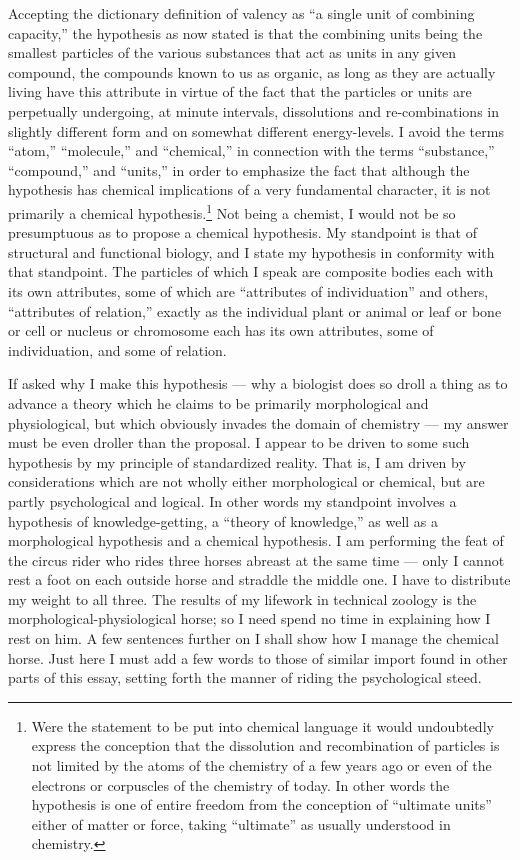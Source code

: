 \documentclass[a4paper, 11pt, oneside, polutonikogreek, english]{article}
\begin{document}
Accepting the dictionary definition of valency as ``a single unit of combining capacity,'' the hypothesis as now stated is that the combining units being the smallest particles of the various substances that act as units in any given compound, the compounds known to us as organic, as long as they are actually living have this attribute in virtue of the fact that the particles or units are perpetually undergoing, at minute intervals, dissolutions and re-combinations in slightly different form and on somewhat different energy-levels. I avoid the terms ``atom,'' ``molecule,'' and ``chemical,'' in connection with the terms ``substance,'' ``compound,'' and ``units,'' in order to emphasize the fact that although the hypothesis has chemical implications of a very fundamental character, it is not primarily a chemical hypothesis.\footnote{Were the statement to be put into chemical language it would undoubtedly express the conception that the dissolution and recombination of particles is not limited by the atoms of the chemistry of a few years ago or even of the electrons or corpuscles of the chemistry of today. In other words the hypothesis is one of entire freedom from the conception of ``ultimate units'' either of matter or force, taking ``ultimate'' as usually understood in chemistry.} Not being a chemist, I would not be so presumptuous as to propose a chemical hypothesis. My standpoint is that of structural and functional biology, and I state my hypothesis in conformity with that standpoint. The particles of which I speak are composite bodies each with its own attributes, some of which are ``attributes of individuation'' and others, ``attributes of relation,'' exactly as the individual plant or animal or leaf or bone or cell or nucleus or chromosome each has its own attributes, some of individuation, and some of relation.

If asked why I make this hypothesis --- why a biologist does so droll a thing as to advance a theory which he claims to be primarily morphological and physiological, but which obviously invades the domain of chemistry --- my answer must be even droller than the proposal. I appear to be driven to some such hypothesis by my principle of standardized reality. That is, I am driven by considerations which are not wholly either morphological or chemical, but are partly psychological and logical. In other words my standpoint involves a hypothesis of knowledge-getting, a ``theory of knowledge,'' as well as a morphological hypothesis and a chemical hypothesis. I am performing the feat of the circus rider who rides three horses abreast at the same time --- only I cannot rest a foot on each outside horse and straddle the middle one. I have to distribute my weight to all three. The results of my lifework in technical zoology is the morphological-physiological horse; so I need spend no time in explaining how I rest on him. A few sentences further on I shall show how I manage the chemical horse. Just here I must add a few words to those of similar import found in other parts of this essay, setting forth the manner of riding the psychological steed.
\end{document}
